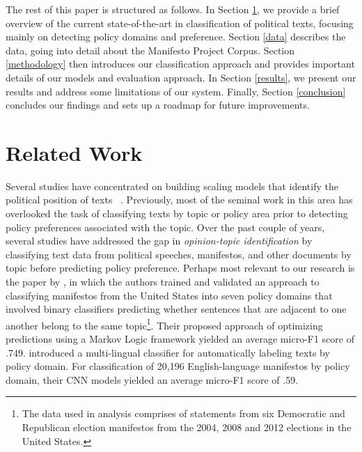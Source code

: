 \documentclass[11pt]{article}
\begin{document}
The rest of this paper is structured as follows. In Section \ref{related_work}, we provide a brief overview of the current state-of-the-art in classification of political texts, focusing mainly on detecting policy domains and preference. Section \ref{data} describes the data, going into detail about the Manifesto Project Corpus. Section \ref{methodology} then introduces our classification approach and provides important details of our models and evaluation approach. In Section \ref{results}, we present our results and address some limitations of our system. Finally, Section \ref{conclusion} concludes our findings and sets up a roadmap for future improvements.


\section{Related Work}
\label{related_work}
Several studies have concentrated on building scaling models that identify the political position of texts ~\cite{glavavs2017cross,laver2003extracting,nanni2019political,proksch2010position}.
Previously, most of the seminal work in this area has overlooked the task of classifying texts by topic or policy area prior to detecting policy preferences associated with the topic.
Over the past couple of years, several studies have addressed the gap in \textit{opinion-topic identification} by classifying text data from political speeches, manifestos, and other documents by topic before predicting policy preference. %
Perhaps most relevant to our research is the paper by , in which the authors trained and validated an approach to classifying manifestos from the United States into seven policy domains that involved binary classifiers predicting whether sentences that are adjacent to one another belong to the same topic\footnote{The data used in analysis comprises of statements from six Democratic and Republican election manifestos from the 2004, 2008 and 2012 elections in the United States.}. Their proposed approach of optimizing predictions using a Markov Logic framework yielded an average micro-F1 score of .749.  introduced a multi-lingual classifier for automatically labeling texts by policy domain. For classification of 20,196 English-language manifestos by policy domain, their CNN models yielded an average micro-F1 score of .59.
\end{document}
